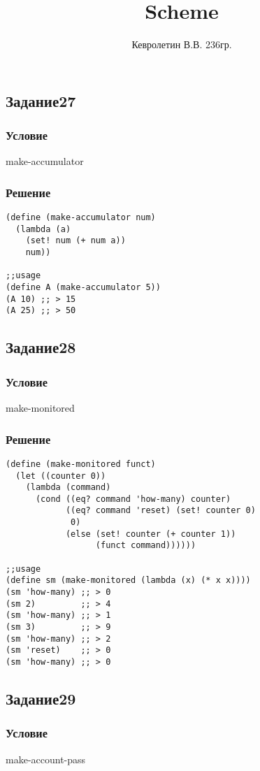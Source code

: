 \documentclass[10pt,a4paper]{article}
\author{Кевролетин В.В. 236гр.}
\title{Scheme}
\begin{document}
\maketitle

\subsection*{Задание27}
\subsubsection*{Условие}
make-accumulator
\subsubsection*{Решение}
\begin{lstlisting}
(define (make-accumulator num)
  (lambda (a)
    (set! num (+ num a))
    num))

;;usage
(define A (make-accumulator 5))
(A 10) ;; > 15
(A 25) ;; > 50
\end{lstlisting}


\subsection*{Задание28}
\subsubsection*{Условие}
make-monitored
\subsubsection*{Решение}
\begin{lstlisting}
(define (make-monitored funct)
  (let ((counter 0))
    (lambda (command)
      (cond ((eq? command 'how-many) counter)
            ((eq? command 'reset) (set! counter 0)
             0)
            (else (set! counter (+ counter 1))
                  (funct command))))))

;;usage
(define sm (make-monitored (lambda (x) (* x x))))
(sm 'how-many) ;; > 0
(sm 2)         ;; > 4
(sm 'how-many) ;; > 1
(sm 3)         ;; > 9
(sm 'how-many) ;; > 2
(sm 'reset)    ;; > 0
(sm 'how-many) ;; > 0
\end{lstlisting}

\subsection*{Задание29}
\subsubsection*{Условие}
make-account-pass
\end{document}
